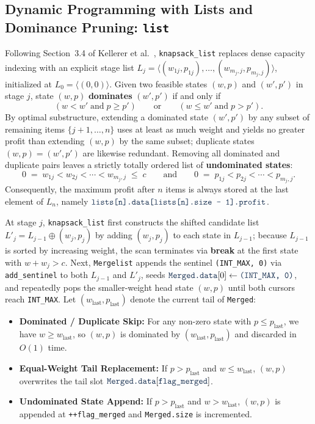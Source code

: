 \documentclass[10pt, a4paper]{article}
\newcommand{\code}[1]{\texttt{\color{primary!90!black}#1}}
\newcommand{\kw}[1]{\textbf{\color{primary}#1}}
\begin{document}
\subsection{Dynamic Programming with Lists and Dominance Pruning: \texttt{list}}
Following Section~3.4 of Kellerer et al.~\cite{kellerer2004knapsack}, \code{knapsack\_list} replaces dense capacity indexing with an explicit stage list $L_j = \langle (w_{1j}, p_{1j}), \ldots, (w_{m_j,j}, p_{m_j,j}) \rangle$, initialized at $L_0 = \langle (0, 0) \rangle$. Given two feasible states $(w, p)$ and $(w', p')$ in stage $j$, state $(w, p)$ \textbf{dominates} $(w', p')$ if and only if
\begin{equation}
  (w < w' \;\text{and}\; p \ge p') \qquad\text{or}\qquad (w \le w' \;\text{and}\; p > p').
  \label{eq:dominance}
\end{equation}
By optimal substructure, extending a dominated state $(w', p')$ by any subset of remaining items $\{j+1, \ldots, n\}$ uses at least as much weight and yields no greater profit than extending $(w, p)$ by the same subset; duplicate states $(w, p) = (w', p')$ are likewise redundant. Removing all dominated and duplicate pairs leaves a strictly totally ordered list of \textbf{undominated states}:
\[
  0 \;=\; w_{1j} < w_{2j} < \cdots < w_{m_j,j} \;\le\; c
  \qquad\text{and}\qquad
  0 \;=\; p_{1j} < p_{2j} < \cdots < p_{m_j,j}.
\]
Consequently, the maximum profit after $n$ items is always stored at the last element of $L_n$, namely $\code{lists[n].data[lists[n].size - 1].profit}$.

At stage $j$, \code{knapsack\_list} first constructs the shifted candidate list $L'_j = L_{j-1} \oplus (w_j, p_j)$ by adding $(w_j, p_j)$ to each state in $L_{j-1}$; because $L_{j-1}$ is sorted by increasing weight, the scan terminates via \kw{break} at the first state with $w + w_j > c$. Next, \code{Mergelist} appends the sentinel \code{(INT\_MAX, 0)} via \code{add\_sentinel} to both $L_{j-1}$ and $L'_j$, seeds $\code{Merged.data}[0] \gets \code{(INT\_MAX, 0)}$, and repeatedly pops the smaller-weight head state $(w, p)$ until both cursors reach \code{INT\_MAX}. Let $(w_{\text{last}}, p_{\text{last}})$ denote the current tail of \code{Merged}:
\begin{itemize}
  \item \textbf{\color{primary}Dominated / Duplicate Skip:} For any non-zero state with $p \le p_{\text{last}}$, we have $w \ge w_{\text{last}}$, so $(w, p)$ is dominated by $(w_{\text{last}}, p_{\text{last}})$ and discarded in $O(1)$ time.
  \item \textbf{\color{primary}Equal-Weight Tail Replacement:} If $p > p_{\text{last}}$ and $w \le w_{\text{last}}$, $(w, p)$ overwrites the tail slot $\code{Merged.data}[\code{flag\_merged}]$.
  \item \textbf{\color{primary}Undominated State Append:} If $p > p_{\text{last}}$ and $w > w_{\text{last}}$, $(w, p)$ is appended at \code{++flag\_merged} and \code{Merged.size} is incremented.
\end{itemize}
\end{document}
